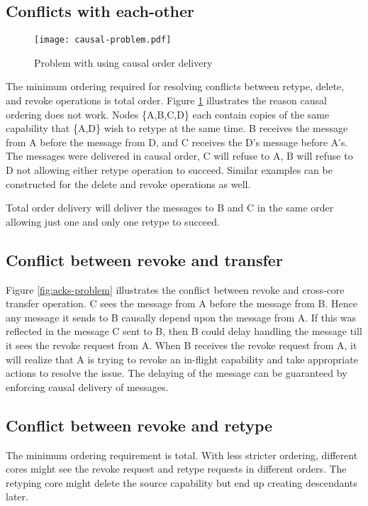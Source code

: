 \documentclass[a4paper,twoside]{report} %
\begin{document}
\subsection{Conflicts with each-other}

\begin{figure}[t]
 \texttt{[image: causal-problem.pdf]}
 \caption{Problem with using causal order
   delivery}\label{fig:causal-problem}
\end{figure}

The minimum ordering required for resolving conflicts between retype,
delete, and revoke operations is total order. Figure
\ref{fig:causal-problem} illustrates the reason causal ordering does
not work. Nodes \{A,B,C,D\} each contain copies of the same capability
that \{A,D\} wish to retype at the same time. B receives the message
from A before the message from D, and C receives the D's message
before A's. The messages were delivered in causal order, C will refuse
to A, B will refuse to D not allowing either retype operation to
succeed. Similar examples can be constructed for the delete and revoke
operations as well.

Total order delivery will deliver the messages to B and C in the same
order allowing just one and only one retype to succeed.

\subsection{Conflict between revoke and transfer}
Figure \ref{fig:acks-problem} illustrates the conflict between revoke
and cross-core transfer operation. C sees the message from A before
the message from B. Hence any message it sends to B causally depend
upon the message from A. If this was reflected in the message C sent
to B, then B could delay handling the message till it sees the revoke
request from A. When B receives the revoke request from A, it will
realize that A is trying to revoke an in-flight capability and take
appropriate actions to resolve the issue. The delaying of the message
can be guaranteed by enforcing causal delivery of messages.

\subsection{Conflict between revoke and retype}
The minimum ordering requirement is total. With less stricter
ordering, different cores might see the revoke request and retype
requests in different orders. The retyping core might delete the
source capability but end up creating descendants later.
\end{document}
